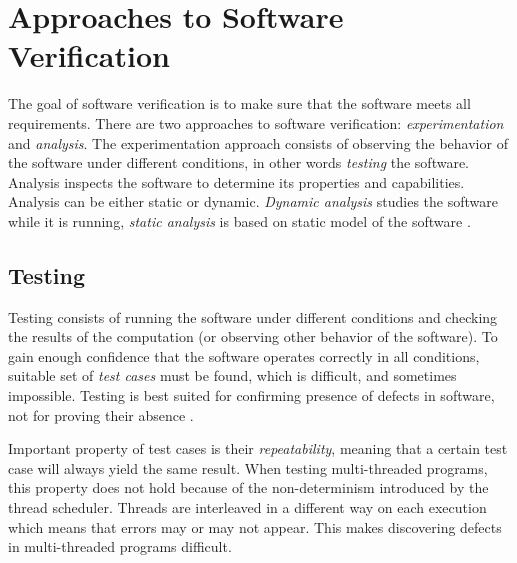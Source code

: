 
\section{Approaches to Software Verification}
\label{approachesToSwVerification}


The goal of software verification is to make sure that the software meets all
requirements. There are two approaches to software verification:
\emph{experimentation} and \emph{analysis}. The experimentation approach
consists of observing the behavior of the software under different conditions,
in other words \emph{testing} the software. Analysis inspects the software to
determine its properties and capabilities. Analysis can be either static or
dynamic. \emph{Dynamic analysis} studies the software while it is running,
\emph{static analysis} is based on static model of the software
\cite{fundamentals}.

\subsection{Testing}

Testing consists of running the software under different conditions and
checking the results of the computation (or observing other behavior of the
software). To gain enough confidence that the software operates correctly in all
conditions, suitable set of \emph{test cases} must be found, which is difficult,
and sometimes impossible. Testing is best suited for confirming presence of
defects in software, not for proving their absence \cite{fundamentals}.

Important property of test cases is their \emph{repeatability}, meaning that a
certain test case will always yield the same result. When testing multi-threaded
programs, this property does not hold because of the non-determinism introduced
by the thread scheduler. Threads are interleaved in a different way on each
execution which means that errors may or may not appear. This makes discovering
defects in multi-threaded programs difficult.

